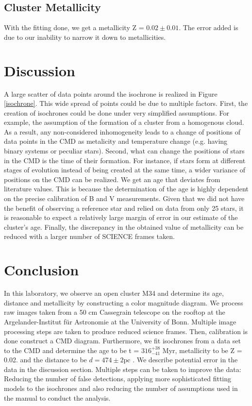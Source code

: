 \documentclass[12pt]{article}
\begin{document}
\subsection{Cluster Metallicity}
With the fitting done, we get a metallicity Z = $0.02 \pm 0.01$. The error added is due to our inability to narrow it down to metallicities. 

\section{Discussion}
A large scatter of data points around the isochrone is realized in Figure \ref{isochrone}. This wide spread of points could be due to multiple factors. First, the creation of isochrones could be done under very simplified assumptions. For example, the assumption of the formation of a cluster from a homogenous cloud. As a result, any non-considered inhomogeneity leads to a change of positions of data points in the CMD as metalicity and temperature change (e.g. having binary systems or peculiar stars). Second, what can change the positions of stars in the CMD is the time of their formation. For instance, if stars form at different stages of evolution instead of being created at the same time, a wider variance of positions on the CMD can be realized. 
We get an age that deviates from literature values. This is because the determination of the age is highly dependent on the precise calibration of B and V measurements. Given that we did not have the benefit of observing a reference star and relied on data from only 25 stars, it is reasonable to expect a relatively large margin of error in our estimate of the cluster's age.
Finally, the discrepancy in the obtained value of metallicity can be reduced with a larger number of SCIENCE frames taken. 

\section{Conclusion}
In this laboratory, we observe an open cluster M34 and determine its age, distance and metallicity by constructing a color magnitude diagram. We process raw images taken from a 50 cm Cassegrain telescope on the rooftop at the Argelander-Institut
für Astronomie at the University of Bonn. Multiple image processing steps are taken to produce reduced science frames. Then, calibration is done construct a CMD diagram. Furthermore, we fit isochrones from a data set to the CMD and determine the age to be t = $316^{+38}_{-41}$ Myr, metallicity to be Z = 0.02. and the distance to be $d = 474 \pm 2 \mathrm{pc}$ .  We describe potential error in the data in the discussion section. Multiple steps can be taken to improve the data: Reducing the number of false detections, applying more sophisticated fitting models to the isochrones and also reducing the number of assumptions used in the manual to conduct the analysis. 
\end{document}
